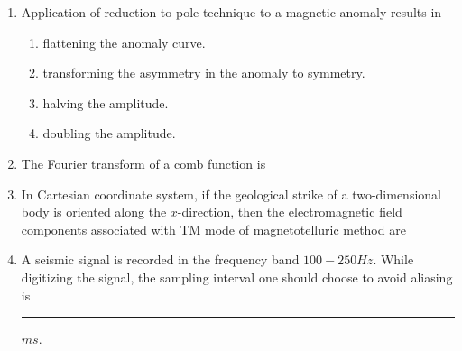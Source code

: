 \documentclass[journal,12pt,onecolumn]{IEEEtran}
\theoremstyle{remark}
\begin{document}
\begin{enumerate}[start = 26 ]
        \item Application of reduction-to-pole technique to a magnetic anomaly results in \hfill{}
            \begin{enumerate}
                \item flattening the anomaly curve.
                \item transforming the asymmetry in the anomaly to symmetry.
                \item halving the amplitude.
                \item doubling the amplitude.
            \end{enumerate}

        \item The Fourier transform of a comb function is \hfill{}
            \begin{enumerate}
            \end{enumerate}
        
        \item In Cartesian coordinate system, if the geological strike of a two-dimensional body is oriented along the $x$-direction, then the electromagnetic field components associated with TM mode of magnetotelluric method are \hfill{}
            \begin{enumerate}
            \end{enumerate}
        
        \item A seismic signal is recorded in the frequency band $100-250 Hz$. While digitizing the signal, the sampling interval one should choose to avoid aliasing is \rule{3cm}{0.15mm} $ms$. \hfill{}


\end{enumerate}
\end{document}

